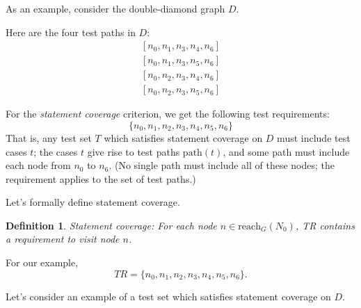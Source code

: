 \documentclass[11pt]{article}
\newtheorem{defn}{Definition}
\begin{document}
\newpage
As an example, consider the double-diamond graph $D$.
\begin{center}
\label{D}
\end{center}
Here are the four test paths in $D$:
\begin{eqnarray*}
&[n_0, n_1, n_3, n_4, n_6]& \\
&[n_0, n_1, n_3, n_5, n_6]& \\
&[n_0, n_2, n_3, n_4, n_6]& \\
&[n_0, n_2, n_3, n_5, n_6]&
\end{eqnarray*}

For the \emph{statement coverage} criterion, we get the following test requirements:
\[ \{ n_0, n_1, n_2, n_3, n_4, n_5, n_6 \} \]
That is, any test set $T$ which satisfies statement coverage on $D$ must include
test cases $t$; the cases $t$ give rise to test paths $\mbox{path}(t)$, and
some path must include each node from $n_0$ to $n_6$. (No single path must
include all of these nodes; the requirement applies to the set of
test paths.)

Let's formally define statement coverage.
\begin{defn}
Statement coverage: For each node $n \in \mbox{reach}_G(N_0)$, \emph{TR} contains
a requirement to visit node $n$.
\end{defn}

For our example,
\[ \mathit{TR} = \{ n_0, n_1, n_2, n_3, n_4, n_5, n_6\}. \]

Let's consider an example of a test set which satisfies statement coverage
on $D$.
\end{document}
